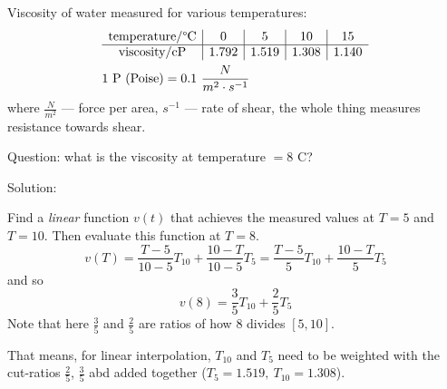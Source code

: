 \begin{example}
    Viscosity of water measured for various temperatures:
    \begin{align*}
        &
        \begin{array}{c|c|c|c|c}
            \text{temperature/\degree C} & 0 & 5 & 10 & 15
            \\\hline
            \text{viscosity/cP} & 1.792 & 1.519 & 1.308 & 1.140
        \end{array}
        \\&
        1 \text{ P (Poise)} = 0.1\ \frac{N}{m^2 \cdot s^{-1}}
    \end{align*}
    where $\frac{N}{m^2}$ --- force per area, $s^{-1}$ --- rate of shear,
    the whole thing measures resistance towards shear.

    Question: what is the viscosity at temperature $= 8$ \degree C?

    Solution:
    \begin{center}   
    \end{center}     
    Find a \textit{linear} function $v(t)$ that achieves
    the measured values at $T = 5$ and $T = 10.$ Then evaluate this function at
    $T = 8$.
    \[ 
        v(T) = \frac{T - 5}{10 - 5} T_{10} + \frac{10 - T}{10 - 5} T_5 =
        \frac{T - 5}{5} T_{10} + \frac{10 - T}{5} T_5
    \]
    and so 
    \[ v(8) = \frac{3}{5} T_{10} + \frac{2}{5} T_5 \]
    Note that here $\frac{3}{5}$ and $\frac{2}{5}$ are ratios of how
    8 divides $[5, 10]$.

    That means, for linear interpolation, $T_{10}$ and $T_5$ need to be
    weighted with the cut-ratios $\frac{2}{5}$, $\frac{3}{5}$
    abd added together ($T_5 = 1.519,\ T_{10} = 1.308$).
\end{example}

